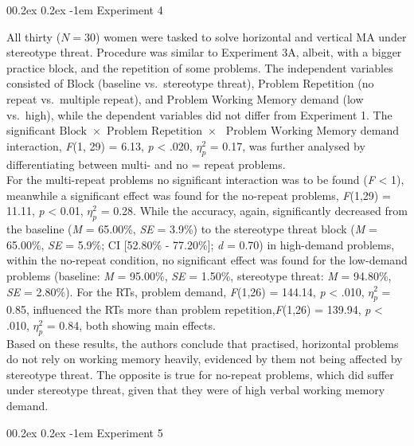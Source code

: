 \documentclass[
  stu,floatsintext]{apa7}
\makeatletter
\let\oldparagraph\paragraph
\renewcommand{\paragraph}[1]{\oldparagraph{#1}\mbox{}}
\renewcommand{\paragraph}{\@startsection{paragraph}{4}{\parindent}%
  {0\baselineskip \@plus 0.2ex \@minus 0.2ex}%
  {-1em}%
  {\normalfont\normalsize\bfseries\itshape\typesectitle}}
\renewcommand{\paragraph}{\@startsection{paragraph}{4}{\parindent}%
  {0\baselineskip \@plus 0.2ex \@minus 0.2ex}%
  {-1em}%
  {\normalfont\normalsize\bfseries\typesectitle}}
\makeatother
\begin{document}
\paragraph{Experiment 4}\label{experiment-4}

All thirty (\(N = 30\)) women were tasked to solve horizontal and vertical MA under stereotype threat.
Procedure was similar to Experiment 3A, albeit, with a bigger practice block, and the repetition of some problems.
The independent variables consisted of Block (baseline vs.~stereotype threat), Problem Repetition (no repeat vs.~multiple repeat), and Problem Working Memory demand (low vs.~high), while the dependent variables did not differ from Experiment 1.
The significant \(\text{Block } \times \text{ Problem Repetition } \times\) \(\text{ Problem Working Memory demand }\) interaction, \emph{F}(1, 29) = 6.13, \emph{p} \textless{} .020, \(\eta^{2}_{p}\) = 0.17, was further analysed by differentiating between multi- and no = repeat problems.\\
For the multi-repeat problems no significant interaction was to be found (\emph{F} \textless{} 1), meanwhile a significant effect was found for the no-repeat problems, \emph{F}(1,29) = 11.11, \emph{p} \textless{} 0.01, \(\eta^{2}_{p}\) = 0.28.
While the accuracy, again, significantly decreased from the baseline (\emph{M} = 65.00\%, \emph{SE} = 3.9\%) to the stereotype threat block (\emph{M} = 65.00\%, \emph{SE} = 5.9\%; CI {[}52.80\% - 77.20\%{]}; \emph{d} = 0.70) in high-demand problems, within the no-repeat condition, no significant effect was found for the low-demand problems (baseline: \emph{M} = 95.00\%, \emph{SE} = 1.50\%, stereotype threat: \emph{M} = 94.80\%, \emph{SE} = 2.80\%).
For the RTs, problem demand, \emph{F}(1,26) = 144.14, \emph{p} \textless{} .010, \(\eta^{2}_{p}\) = 0.85, influenced the RTs more than problem repetition,\emph{F}(1,26) = 139.94, \emph{p} \textless{} .010, \(\eta^{2}_{p}\) = 0.84, both showing main effects.\\
Based on these results, the authors conclude that practised, horizontal problems do not rely on working memory heavily, evidenced by them not being affected by stereotype threat.
The opposite is true for no-repeat problems, which did suffer under stereotype threat, given that they were of high verbal working memory demand.

\paragraph{Experiment 5}\label{experiment-5}
\end{document}

